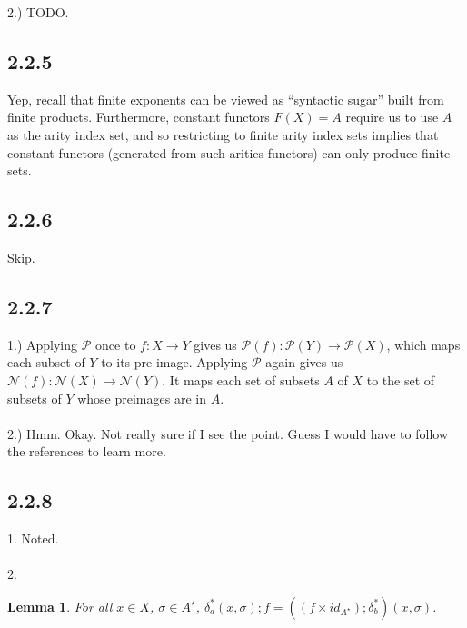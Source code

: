 \documentclass{article}
\newtheorem{lemma}{Lemma}
\begin{document}
2.) TODO.

\subsection*{2.2.5}

Yep, recall that finite exponents can be viewed as ``syntactic sugar'' built from finite products. Furthermore, 
constant functors $F(X) = A$ require us to use $A$ as the arity index set, and so restricting to finite arity index sets
implies that constant functors (generated from such arities functors) can only produce finite sets.   

\subsection*{2.2.6}

Skip.

\subsection*{2.2.7}

1.) Applying $\mathcal P$ once to $f : X \to Y$ gives us $\mathcal P(f) : \mathcal P(Y) \to \mathcal P(X)$, which
maps each subset of $Y$ to its pre-image. Applying $\mathcal P$ again gives us 
$\mathcal N(f) : \mathcal N(X) \to \mathcal N(Y)$. It maps each set of subsets $A$ of $X$ to the set of subsets of $Y$ whose
preimages are in $A$.\\~\\
2.) Hmm. Okay. Not really sure if I see the point. Guess I would have to follow the references to learn more.

\subsection*{2.2.8}

\begin{center}
\end{center}
1. Noted.\\~\\
2. 

\begin{lemma}
For all $x \in X$, $\sigma \in A^{\star}$, $\delta_a^*(x,\sigma);f = ((f \times id_{A^\star});\delta_b^*)(x,\sigma)$.
\end{lemma}
\end{document}
